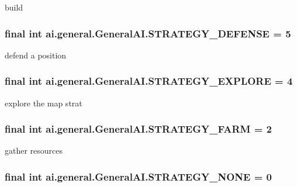 \label{classai_1_1general_1_1_general_a_i_ac8bca2198328c720d0f098f86c7f994c}
build \hypertarget{classai_1_1general_1_1_general_a_i_aab919e88ee21463d0a217f8bccd0a175}{
\subsubsection[{STRATEGY\_\-DEFENSE}]{\setlength{\rightskip}{0pt plus 5cm}final int {\bf ai.general.GeneralAI.STRATEGY\_\-DEFENSE} = 5}}
\label{classai_1_1general_1_1_general_a_i_aab919e88ee21463d0a217f8bccd0a175}
defend a position \hypertarget{classai_1_1general_1_1_general_a_i_af442f56d5a030005a92174b3d453c57f}{
\subsubsection[{STRATEGY\_\-EXPLORE}]{\setlength{\rightskip}{0pt plus 5cm}final int {\bf ai.general.GeneralAI.STRATEGY\_\-EXPLORE} = 4}}
\label{classai_1_1general_1_1_general_a_i_af442f56d5a030005a92174b3d453c57f}
explore the map strat \hypertarget{classai_1_1general_1_1_general_a_i_a76c1b6db73db244f96e52a0ed72bb5c0}{
\subsubsection[{STRATEGY\_\-FARM}]{\setlength{\rightskip}{0pt plus 5cm}final int {\bf ai.general.GeneralAI.STRATEGY\_\-FARM} = 2}}
\label{classai_1_1general_1_1_general_a_i_a76c1b6db73db244f96e52a0ed72bb5c0}
gather resources \hypertarget{classai_1_1general_1_1_general_a_i_ad9254d54bbe6ccd739bf82b24fbb4c52}{
\subsubsection[{STRATEGY\_\-NONE}]{\setlength{\rightskip}{0pt plus 5cm}final int {\bf ai.general.GeneralAI.STRATEGY\_\-NONE} = 0}}
